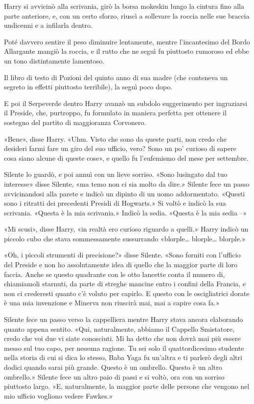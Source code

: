 Harry si avvicinò alla scrivania, girò la borsa mokeskin lungo la cintura fino alla parte anteriore, e, con un certo sforzo, riuscì a sollevare la roccia nelle sue braccia undicenni e a infilarla dentro.

Poté davvero sentire il peso diminuire lentamente, mentre l’incantesimo del Bordo Allargante mangiò la roccia, e il rutto che ne seguì fu piuttosto rumoroso ed ebbe un tono distintamente lamentoso.

Il libro di testo di Pozioni del quinto anno di sua madre (che conteneva un segreto in effetti piuttosto terribile), la seguì poco dopo.

E poi il Serpeverde dentro Harry avanzò un subdolo suggerimento per ingraziarsi il Preside, che, purtroppo, fu formulato in maniera perfetta per ottenere il sostegno del partito di maggioranza Corvonero.

«Bene», disse Harry. «Uhm. Visto che sono da queste parti, non credo che desideri farmi fare un giro del suo ufficio, vero? Sono un po’ curioso di sapere cosa siano alcune di queste cose», e quello fu l’eufemismo del mese per settembre.

Silente lo guardò, e poi annuì con un lieve sorriso. «Sono lusingato dal tuo interesse» disse Silente, «ma temo non ci sia molto da dire.» Silente fece un passo avvicinandosi alla parete e indicò un dipinto di un uomo addormentato. «Questi sono i ritratti dei precedenti Presidi di Hogwarts.» Si voltò e indicò la sua scrivania. «Questa è la mia scrivania.» Indicò la sedia. «Questa è la mia sedia –»

«Mi scusi», disse Harry, «in realtà ero curioso riguardo a quelli.» Harry indicò un piccolo cubo che stava sommessamente sussurrando «blorple… blorple… blorple.»

«Oh, i piccoli strumenti di precisione?» disse Silente. «Sono forniti con l’ufficio del Preside e non ho assolutamente idea di quello che la maggior parte di loro faccia. Anche se questo quadrante con le otto lancette conta il numero di, chiamiamoli starnuti, da parte di streghe mancine entro i confini della Francia, e non ci crederesti quanto c’è voluto per capirlo. E questo con le oscigliatrici dorate è una mia invenzione e Minerva non riuscirà mai, mai a capire cosa fa.»

Silente fece un passo verso la cappelliera mentre Harry stava ancora elaborando quanto appena sentito. «Qui, naturalmente, abbiamo il Cappello Smistatore, credo che voi due vi siate conosciuti. Mi ha detto che non dovrà mai più essere messo sul tuo capo, per nessuna ragione. Tu sei solo il quattordicesimo studente nella storia di cui si dica lo stesso, Baba Yaga fu un’altra e ti parlerò degli altri dodici quando sarai più grande. Questo è un ombrello. Questo è un altro ombrello.» Silente fece un altro paio di passi e si voltò, ora con un sorriso piuttosto largo. «E, naturalmente, la maggior parte delle persone che vengono nel mio ufficio vogliono vedere Fawkes.»

